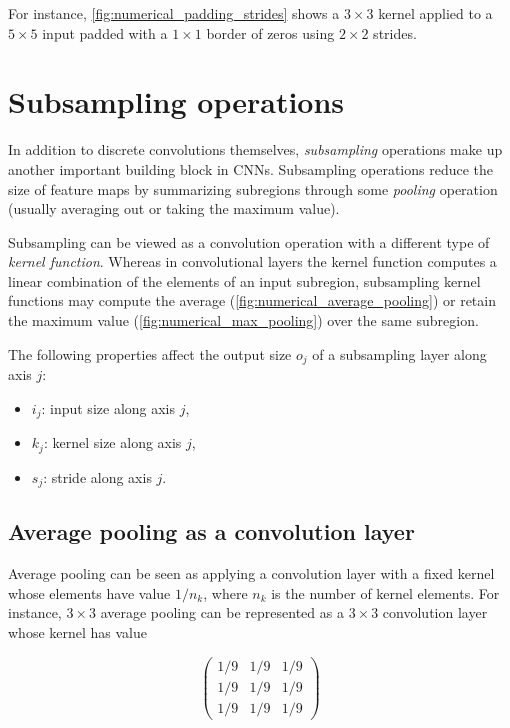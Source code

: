 \documentclass{report}
\begin{document}
For instance, \autoref{fig:numerical_padding_strides} shows a $3 \times 3$
kernel applied to a $5 \times 5$ input padded with a $1 \times 1$ border of
zeros using $2 \times 2$ strides.

\section{Subsampling operations}

In addition to discrete convolutions themselves, {\em subsampling} operations
make up another important building block in CNNs. Subsampling operations reduce
the size of feature maps by summarizing subregions through some {\em pooling}
operation (usually averaging out or taking the maximum value).

Subsampling can be viewed as a convolution operation with a different type of
{\em kernel function}. Whereas in convolutional layers the kernel function
computes a linear combination of the elements of an input subregion, subsampling
kernel functions may compute the average
(\autoref{fig:numerical_average_pooling}) or retain the maximum value
(\autoref{fig:numerical_max_pooling}) over the same subregion.

The following properties affect the output size $o_j$ of a subsampling layer
along axis $j$:

\begin{itemize}
    \item $i_j$: input size along axis $j$,
    \item $k_j$: kernel size along axis $j$,
    \item $s_j$: stride along axis $j$.
\end{itemize}

\subsection{Average pooling as a convolution layer}

Average pooling can be seen as applying a convolution layer with a fixed kernel
whose elements have value $1/n_k$, where $n_k$ is the number of kernel elements.
For instance, $3 \times 3$ average pooling can be represented as a $3 \times 3$
convolution layer whose kernel has value

\begin{equation*}
\begin{pmatrix}
    1/9 & 1/9 & 1/9 \\
    1/9 & 1/9 & 1/9 \\
    1/9 & 1/9 & 1/9
\end{pmatrix}
\end{equation*}
\end{document}
